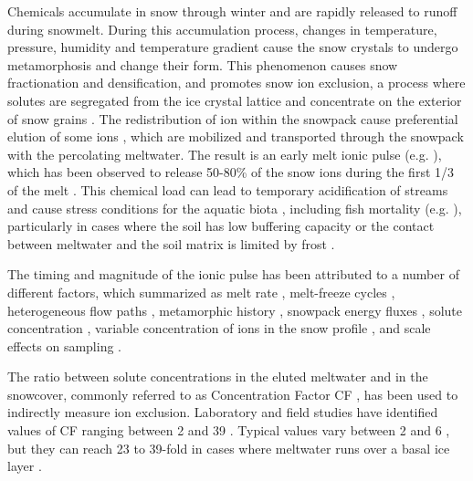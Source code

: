 \documentclass[authoryear,preprint,review,12pt]{elsarticle}
\begin{document}
Chemicals accumulate in snow through winter and are rapidly released to runoff during snowmelt. During this accumulation process, changes in temperature, pressure, humidity and temperature gradient cause the snow crystals to undergo metamorphosis and change their form. This phenomenon causes snow fractionation and densification, and promotes snow ion exclusion, a process where solutes are segregated from the ice crystal lattice and concentrate on the exterior of snow grains \citep{Colbeck1976,Davis1991,Pomeroy2005,Lilbaek2007}. The redistribution of ion within the snowpack cause preferential elution of some ions \citep{Johannessen1978}, which are mobilized and transported through the snowpack with the percolating meltwater. The result is an early melt ionic pulse (e.g. \citet{Davis1991,Lilbaek2008}), which has been observed to release 50-80\% of the snow ions during the first 1/3 of the melt \citep{Maule1990}. This chemical load can lead to temporary acidification of streams and cause stress conditions for the aquatic biota \citep{Marsh1999}, including fish mortality (e.g. \citealp{Driscoll1980,Gunn1984}), particularly in cases where the soil has low buffering capacity \citep{Jr1990,Tranter1988} or the contact between meltwater and the soil matrix is limited by frost \citep{Ferrier1989}. \par

The timing and magnitude of the ionic pulse has been attributed to a number of different factors, which \citet{Harrington1998} summarized as melt rate \citep{Colbeck1981,Marsh1993}, melt-freeze cycles \citep{Tsiouris1985,Bales1993}, heterogeneous flow paths \citep{Jones1985,Bales1990,Marsh1993,HARRINGTON1996}, metamorphic history \citep{Davis1991,Hewitt1991}, snowpack energy fluxes \citep{Suzuki1991,Williams1996}, solute concentration \citep{Brimblecombe1987,Domine1995}, variable concentration of ions in the snow profile \citep{Colbeck1981,Bales1989}, and scale effects on sampling \citep{Marsh1993}. \par

The ratio between solute concentrations in the eluted meltwater and in the snowcover, commonly referred to as Concentration Factor CF \citep{Johannessen1978,Stein1986}, has been used to indirectly measure ion exclusion. Laboratory and field studies have identified values of CF ranging between 2 \citep{Hodson2006} and 39 \citep{Tranter1991}. Typical values vary between 2 and 6 \citep{Tranter1991}, but they can reach 23 to 39-fold in cases where meltwater runs over a basal ice layer \citep{Hodson2006}. \par
\end{document}
